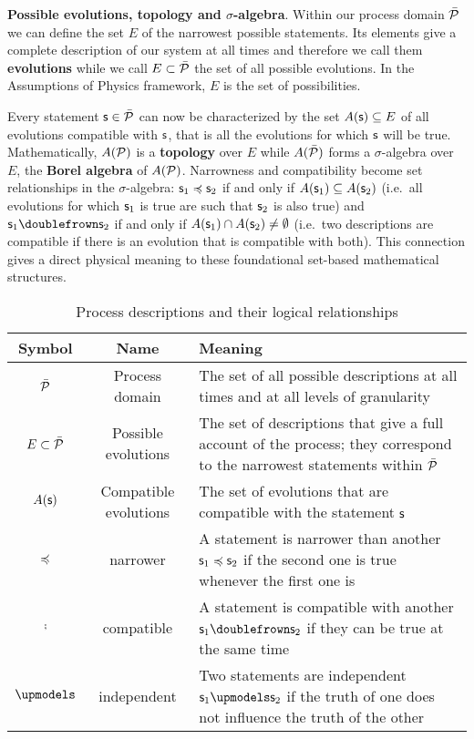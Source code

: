 \documentclass[10pt, onecolumn, longbibliography, nofootinbib]{revtex4-2}
\begin{document}
\textbf{Possible evolutions, topology and $\sigma$-algebra}. Within our process domain $\tdomain[P]$ we can define the set $E$ of the narrowest possible statements. Its elements give a complete description of our system at all times and therefore we call them \textbf{evolutions} while we call $E \subset \tdomain[P]$ the set of all possible evolutions. In the Assumptions of Physics framework, $E$ is the set of possibilities.

Every statement $\stmt \in \tdomain[P]$ can now be characterized by the set $A(\stmt) \subseteq E$ of all evolutions compatible with $\stmt$, that is all the evolutions for which $\stmt$ will be true. Mathematically,  $A(\edomain[P])$ is a \textbf{topology} over $E$ while $A(\tdomain[P])$ forms a $\sigma$-algebra over $E$, the \textbf{Borel algebra} of $A(\edomain[P])$. Narrowness and compatibility become set relationships in the $\sigma$-algebra: $\stmt_1 \narrower \stmt_2$ if and only if $A(\stmt_1) \subseteq A(\stmt_2)$ (i.e.~all evolutions for which $\stmt_1$ is true are such that $\stmt_2$ is also true) and $\stmt_1 \comp \stmt_2$ if and only if $A(\stmt_1) \cap A(\stmt_2) \neq \emptyset$ (i.e.~two descriptions are compatible if there is an evolution that is compatible with both). This connection gives a direct physical meaning to these foundational set-based mathematical structures.

\begin{table}[h!]
	\centering
	\begin{tabular}{|c|c|p{6cm}|}
		\hline 
		Symbol & Name & Meaning \\ 
		\hline 
		$\tdomain[P]$ & Process domain & The set of all possible descriptions at all times and at all levels of granularity \\ 
		\hline 
		$E \subset \tdomain[P]$ & Possible evolutions & The set of descriptions that give a full account of the process; they correspond to the narrowest statements within $\tdomain[P]$ \\ 
		\hline 
		$A(\stmt)$ & Compatible evolutions & The set of evolutions that are compatible with the statement $\stmt$ \\ 
		\hline 
		$\narrower$ & narrower & A statement is narrower than another $\stmt_1 \narrower \stmt_2$ if the second one is true whenever the first one is \\ 
		\hline 
		$\comp$ & compatible & A statement is compatible with another $\stmt_1 \comp \stmt_2$ if they can be true at the same time \\ 
		\hline 
		$\indep$ & independent & Two statements are independent  $\stmt_1 \indep \stmt_2$ if the truth of one does not influence the truth of the other \\ 
		\hline 
	\end{tabular}
	\caption{Process descriptions and their logical relationships}
	\label{table:logic}
\end{table}
\end{document}
